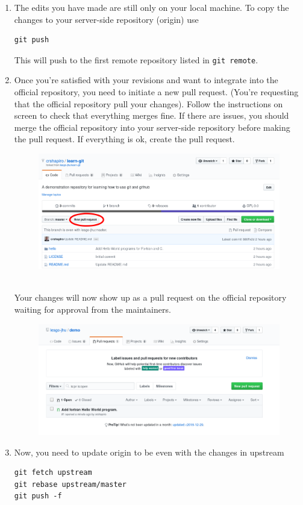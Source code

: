 \documentclass{article}
\begin{document}
\begin{enumerate}
\item The edits you have made are still only on your local machine. To copy the changes to your server-side repository (origin) use
\begin{lstlisting}
git push 
\end{lstlisting}
This will push to the first remote repository listed in \texttt{git remote}.

\item Once you're satisfied with your revisions and want to integrate into the official repository, you need to initiate a new pull request.  (You're requesting that the official repository pull your changes). Follow the instructions on screen to check that everything merges fine. If there are issues, you should merge the official repository into your server-side repository before making the pull request. If everything is ok, create the pull request. 
\begin{figure}[h!]
\centering
\includegraphics[width=\textwidth]{pull1.png}
\end{figure}\\
Your changes will now show up as a pull request on the official repository waiting for approval from the maintainers.
\begin{figure}[h!]
\centering
\includegraphics[width=\textwidth]{pull2.png}
\end{figure}

\pagebreak
\item Now, you need to update origin to be even with the changes in upstream
\begin{lstlisting}
git fetch upstream
git rebase upstream/master
git push -f
\end{lstlisting}

\end{enumerate}
\end{document}
